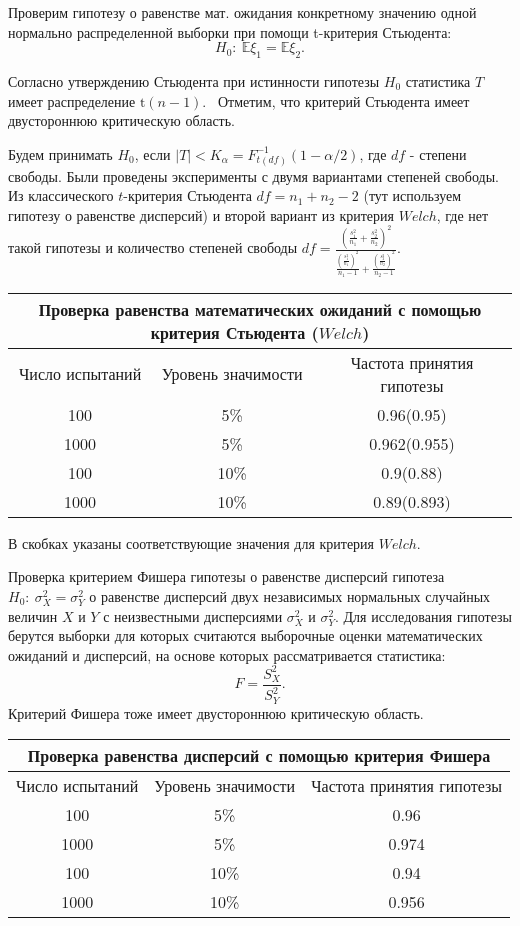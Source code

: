 \documentclass[11pt]{article}
\begin{document}
Проверим гипотезу о равенстве мат. ожидания конкретному значению одной нормально распределенной выборки при помощи t-критерия Стьюдента:
$$
H_0:~ \mathbb{E}\xi_1 = \mathbb{E}\xi_2.
$$

Согласно утверждению Стьюдента при истинности гипотезы $H_0$ статистика $T$ имеет распределение $\mathrm{t}(n-1)$. \
Отметим, что критерий Стьюдента имеет двустороннюю критическую область.

Будем принимать $H_0$, если $|T| < K_\alpha = F^{-1}_{t(df)}(1-\alpha/2)$, где $df$ - степени свободы. Были проведены эксперименты с двумя вариантами степеней свободы. Из классического $t$-критерия Стьюдента $df = n_1 + n_2 - 2$ (тут используем гипотезу о равенстве дисперсий) и второй вариант из критерия $Welch$, где нет такой гипотезы и количество степеней свободы $df =  \frac{\left(\frac{s_1^2}{n_1} + \frac{s_2^2}{n_2}\right)^2}{\frac{\left(\frac{s_1^2}{n_1}\right)^2}{n_1-1} + \frac{\left(\frac{s_2^2}{n_2}\right)^2}{n_2-1}}$. 


\begin{tabular}{|c|c|c|}
\hline
\multicolumn{3}{|c|}{Проверка равенства математических ожиданий с помощью критерия Стьюдента ($Welch$)} \\
\hline
Число испытаний & Уровень значимости & Частота принятия гипотезы \\
\hline
100 & 5\% & 0.96(0.95) \\
1000 & 5\% & 0.962(0.955) \\
100 & 10\% & 0.9(0.88) \\
1000 & 10\% & 0.89(0.893) \\
\hline
\end{tabular}
В скобках указаны соответствующие значения для критерия $Welch$.

Проверка критерием Фишера гипотезы о равенстве дисперсий
гипотеза $ H_0:~ \sigma_X^2 = \sigma_Y^2$ о равенстве дисперсий двух независимых нормальных случайных величин $X$ и $Y$ с неизвестными дисперсиями $\sigma_X^2$ и $\sigma_Y^2$. Для исследования гипотезы берутся выборки для которых считаются выборочные оценки математических ожиданий и дисперсий, на основе которых
рассматривается статистика:
$$
  F = \frac{S_X^2}{S_Y^2}.
$$
Критерий Фишера тоже имеет двустороннюю критическую область.

\begin{tabular}{|c|c|c|}
\hline
\multicolumn{3}{|c|}{Проверка равенства дисперсий с помощью критерия Фишера} \\
\hline
Число испытаний & Уровень значимости & Частота принятия гипотезы \\
\hline
100 & 5\% & 0.96 \\
1000 & 5\% & 0.974 \\
100 & 10\% & 0.94 \\
1000 & 10\% & 0.956 \\
\hline
\end{tabular}
\end{document}
